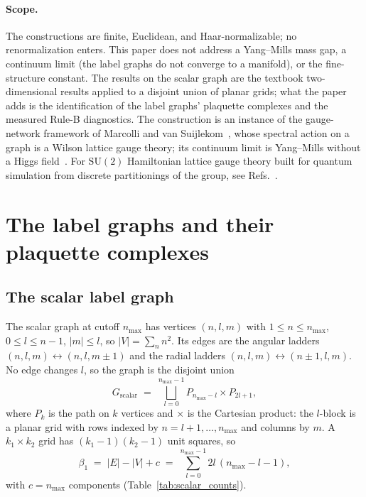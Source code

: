 \documentclass[11pt]{article}
\begin{document}
\paragraph*{Scope.}
The constructions are finite, Euclidean, and Haar-normalizable; no
renormalization enters.  This paper does not address a Yang--Mills mass gap,
a continuum limit (the label graphs do not converge to a manifold), or the
fine-structure constant.  The results on the scalar graph are the textbook
two-dimensional results applied to a disjoint union of planar grids; what
the paper adds is the identification of the label graphs' plaquette
complexes and the measured Rule-B diagnostics.  The construction is an
instance of the gauge-network framework of Marcolli and van
Suijlekom~\cite{marcolli_vs2014}, whose spectral action on a graph is a
Wilson lattice gauge theory; its continuum limit is Yang--Mills without a
Higgs field~\cite{perez_sanchez2025}.  For $\mathrm{SU}(2)$ Hamiltonian
lattice gauge theory built for quantum simulation from discrete
partitionings of the group, see Refs.~\cite{garofalo2023_su2_s3,jakobs2025_su2_dynamics}.

\section{The label graphs and their plaquette complexes}
\label{sec:graphs}

\subsection{The scalar label graph}
\label{sec:scalar_graph}

The scalar graph at cutoff $n_{\max}$ has vertices $(n,l,m)$ with
$1\le n\le n_{\max}$, $0\le l\le n-1$, $|m|\le l$, so $|V|=\sum_n n^2$.
Its edges are the angular ladders $(n,l,m)\leftrightarrow(n,l,m\pm1)$ and
the radial ladders $(n,l,m)\leftrightarrow(n\pm1,l,m)$.  No edge changes
$l$, so the graph is the disjoint union
\begin{equation}
G_{\mathrm{scalar}} \;=\; \bigsqcup_{l=0}^{n_{\max}-1}
  P_{n_{\max}-l}\times P_{2l+1},
\label{eq:grid_decomposition}
\end{equation}
where $P_k$ is the path on $k$ vertices and $\times$ is the Cartesian
product: the $l$-block is a planar grid with rows indexed by
$n=l+1,\ldots,n_{\max}$ and columns by $m$.  A $k_1\times k_2$ grid has
$(k_1-1)(k_2-1)$ unit squares, so
\begin{equation}
\beta_1 \;=\; |E|-|V|+c \;=\; \sum_{l=0}^{n_{\max}-1} 2l\,(n_{\max}-l-1),
\label{eq:betti_scalar}
\end{equation}
with $c=n_{\max}$ components (Table~\ref{tab:scalar_counts}).
\end{document}

